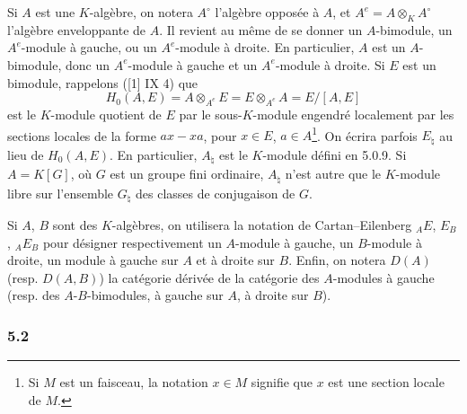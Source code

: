\documentclass[11pt]{article}
\begin{document}
Si $A$ est une $K$-algèbre, on notera $A^\circ$ l'algèbre opposée à $A$, et $A^e=A\otimes_KA^\circ$ l'algèbre enveloppante de $A$. Il revient au même de se donner un $A$-bimodule, un $A^e$-module à gauche, ou un $A^e$-module à droite. En particulier, $A$ est un $A$-bimodule, donc un $A^e$-module à gauche et un $A^e$-module à droite. Si $E$ est un bimodule, rappelons ([1] IX 4) que
\[
H_0(A,E)=A\otimes_{A^e}E=E\otimes_{A^e}A=E/[A,E]
\]
est le $K$-module quotient de $E$ par le sous-$K$-module engendré localement par les sections locales de la forme $ax-xa$, pour $x\in E$, $a\in A$\footnote{Si $M$ est un faisceau, la notation $x\in M$ signifie que $x$ est une section locale de $M$.}. On écrira parfois $E_\natural$ au lieu de $H_0(A,E)$. En particulier, $A_\natural$ est le $K$-module défini en 5.0.9. Si $A=K[G]$, où $G$ est un groupe fini ordinaire, $A_\natural$ n'est autre que le $K$-module libre sur l'ensemble $G_\natural$ des classes de conjugaison de $G$.

Si $A$, $B$ sont des $K$-algèbres, on utilisera la notation de Cartan--Eilenberg ${}_AE$, $E_B$, ${}_AE_B$ pour désigner respectivement un $A$-module à gauche, un $B$-module à droite, un module à gauche sur $A$ et à droite sur $B$. Enfin, on notera $D(A)$ (resp. $D(A,B)$) la catégorie dérivée de la catégorie des $A$-modules à gauche (resp. des $A$-$B$-bimodules, à gauche sur $A$, à droite sur $B$).

\subsubsection*{5.2}
\end{document}
